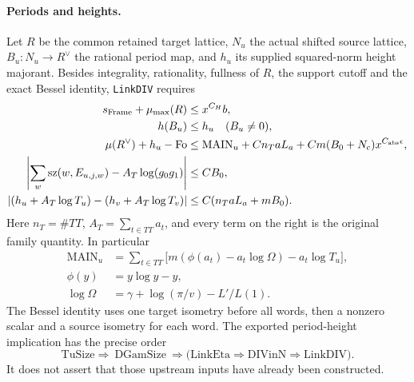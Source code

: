 \documentclass[11pt,a4paper]{article}
\numberwithin{equation}{section}
\theoremstyle{remark}\newtheorem{remark}[theorem]{Remark}
\begin{document}
\paragraph{Periods and heights.}
Let $R$ be the common retained target lattice, $N_u$ the actual shifted
source lattice, $B_u:N_u\to R^\vee$ the rational period map, and
$h_u$ its supplied squared-norm height majorant. Besides integrality,
rationality, fullness of $R$, the support cutoff and the exact Bessel
identity, \texttt{Link\allowbreak DIV} requires
\begin{align}
 s_{\rm Frame}+\mu_{\max}(R)&\le x^{C_H}b,
                                                        \label{eq:gqt-height1}\\
 h(B_u)&\le h_u\quad(B_u\ne0),                           \label{eq:gqt-height2}\\
 \mu(R^\vee)+h_u-\mathrm{Fo}
   &\le\mathrm{MAIN}_u+C n_TaL_a
       +Cm(B_0+N_c)x^{C_{\rm abs}\epsilon},               \label{eq:gqt-height3}\\
 \left|\sum_w\mathrm{sz}(w,\allowbreak{} E_{u,\allowbreak{} j,\allowbreak{} w})
                  -A_T\log(g_0g_1)\right|&\le CB_0,     \label{eq:gqt-height4}\\
 \left|(h_u+A_T\log T_u)-(h_v+A_T\log T_v)\right|
       &\le C(n_TaL_a+mB_0).                             \label{eq:gqt-height5}
\end{align}
Here $n_T=\#TT$, $A_T=\sum_{t\in TT}a_t$, and every term on
the right is the original family quantity. In particular
\[
 \begin{aligned}
 \mathrm{MAIN}_u&=
 \sum_{t\in TT}\bigl[m(\phi(a_t)-a_t\log\Omega)-a_t\log T_u\bigr],\\
 \phi(y)&=y\log y-y,\\
 \log\Omega&=\gamma+\log(\pi/v)-L'/L(1).
 \end{aligned}
\]
The Bessel identity uses one target isometry before all words, then a
nonzero scalar and a source isometry for each word. The exported
period-height implication has the precise order
\[
 \mathrm{TuSize}\Longrightarrow\ \mathrm{DGamSize}\
 \Longrightarrow\bigl(\mathrm{LinkEta}\Longrightarrow
                     \mathrm{DIVinN}\Longrightarrow\mathrm{LinkDIV}\bigr).
\]
It does not assert that those upstream inputs have already been
constructed.
\end{document}
